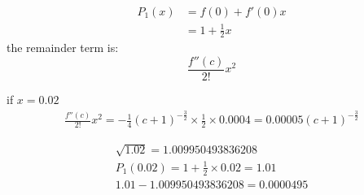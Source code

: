 \documentclass[UTF8]{ctexart}
\begin{document}
\begin{enumerate}
\begin{align*}
P_1(x) &= f(0) + f'(0)x \\
&= 1 + \frac{1}{2}x
\end{align*}
the remainder term is:
\[
	\frac{f''(c)}{2!}x^2
\]

if $x = 0.02$
\begin{align*}
	\frac{f''(c)}{2!}x^2 = -\frac{1}{4}(c+1)^{-\frac{3}{2}} \times \frac{1}{2} \times 0.0004 = 0.00005(c+1)^{-\frac{3}{2}}
\end{align*}

\begin{gather*}
	\sqrt{1.02} = 1.009950493836208 \\
	P_1(0.02) = 1 + \frac{1}{2} \times 0.02 = 1.01 \\
	1.01 - 1.009950493836208 = 0.0000495
\end{gather*}

\end{enumerate}
\end{document}

